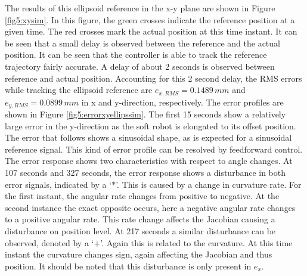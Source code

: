 The results of this ellipsoid reference in the x-y plane are shown in Figure \ref{fig5:xysim}. In this figure, the green crosses indicate the reference position at a given time. The red crosses mark the actual position at this time instant. It can be seen that a small delay is observed between the reference and the actual position. It can be seen that the controller is able to track the reference trajectory fairly accurate. A delay of about 2 seconds is observed between reference and actual position. Accounting for this 2 second delay, the RMS errors while tracking the ellipsoid reference are $e_{x,RMS} = 0.1489 \hspace{2pt} mm$ and $e_{y,RMS} =0.0899  \hspace{2pt} mm$ in x and y-direction, respectively. The error profiles are shown in Figure \ref{fig5:errorxyellipssim}. The first 15 seconds show a relatively large error in the y-direction as the soft robot is elongated to its offset position. The error that follows shows a sinusoidal shape, as is expected for a sinusoidal reference signal. This kind of error profile can be resolved by feedforward control. The error response shows two characteristics with respect to angle changes. At 107 seconds and 327 seconds, the error response shows a disturbance in both error signals, indicated by a `$*$'. This is caused by a change in curvature rate. For the first instant, the angular rate changes from positive to negative. At the second instance the exact opposite occurs, here a negative angular rate changes to a positive angular rate. This rate change affects the Jacobian causing a disturbance on position level. At 217 seconds a similar disturbance can be observed, denoted by a `$+$'. Again this is related to the curvature. At this time instant the curvature changes sign, again affecting the Jacobian and thus position. It should be noted that this disturbance is only present in $e_x$.


